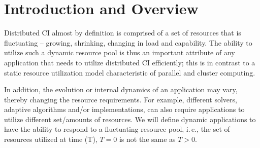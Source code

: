 \documentclass[conference,final]{IEEEtran}
\newcommand{\jhanote}[1]{ {\textcolor{red} { ***shantenu: #1 }}}
\newcommand{\alnote}[1]{ {\textcolor{blue} { ***andre: #1 }}}
\newcommand{\alnote}[1]{}
\newcommand{\jhanote}[1]{}
\newcommand{\upp}{\vspace*{-0.5em}}
\begin{document}




\section{Introduction and Overview \upp\upp}

Distributed CI almost by definition is comprised of a set of resources
that is fluctuating -- growing, shrinking, changing in load and
capability.  The ability to utilize such a dynamic resource pool is
thus an important attribute of any application that needs to utilize
distributed CI efficiently; this is in contrast to a static resource
utilization model characteristic of parallel and cluster computing.

In addition, the evolution or internal dynamics of an application may
vary, thereby changing the resource requirements.
For example, different solvers, %
adaptive algorithms and/or implementations, can also require
applications to utilize different set/amounts of resources.
We will define dynamic applications to have the ability to respond to
a fluctuating resource pool, i.\,e., the set of resources utilized at
time (T), $T=0$ is not the same as $T>0$.
\end{document}
